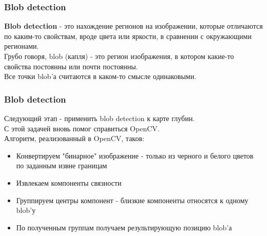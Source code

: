 \documentclass{beamer}
\begin{document}
		\begin{frame}
			\frametitle{Blob detection}
			
			\textbf{Blob detection} - это нахождение регионов на изображении,
			которые отличаются по каким-то свойствам, вроде цвета
			или яркости, в сравнении с окружающими регионами.\\
			Грубо говоря, blob (капля) - это регион изображения,
			в котором какие-то свойства постоянны или почти
			постоянны.\\
			Все точки blob'а считаются в каком-то смысле
			одинаковыми.\\
		\end{frame}
		
		\begin{frame}
			\frametitle{Blob detection}
			
			Следующий этап - применить blob detection к карте глубин.\\
			С этой задачей вновь помог справиться OpenCV.\\
			Алгоритм, реализованный в OpenCV, таков:\\
			\begin{itemize}
				\item Конвертируем "бинарное" изображение - только
					  из черного и белого цветов по заданным извне границам
				\item Извлекаем компоненты связности
				\item Группируем центры компонент - близкие компоненты относятся к одному 
				      blob'у
				\item По полученным группам получаем результирующую позицию blob'а
			\end{itemize}
		\end{frame}
\end{document}
